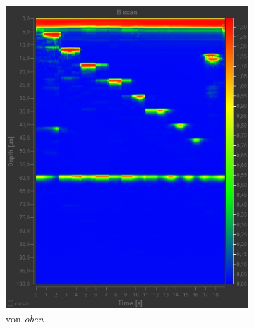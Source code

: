 \begin{figure}[h!]
	\centering
	\begin{subfigure}{.45\textwidth}
		\includegraphics[width=\textwidth]{oben.png}
		\caption{von \emph{oben}}
		\label{fig:oben}
	\end{subfigure}
	\begin{subfigure}{.45\textwidth}

\end{subfigure}
\end{figure}
